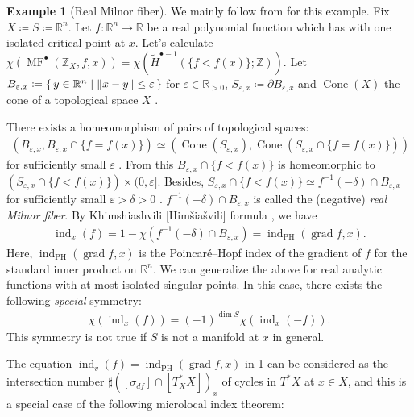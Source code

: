 \documentclass[a4paper,dvipdfmx,reqno,12pt]{amsart}
\theoremstyle{definition}
\newtheorem{example}[theorem]{Example}
\newcommand{\deq}{\coloneqq}
\newcommand{\Z}{\mathbb{Z}}%
\newcommand{\vep}{\varepsilon}%
\newcommand{\opn}[1]{\operatorname{#1}}
\numberwithin{equation}{section}
\begin{document}
\begin{example}[{Real Milnor fiber}] 
\label{example-milnor-morse-data}
We mainly follow from \cite[3.2]{MR3779558} for this example.
Fix $X\deq S\deq \mathbb{R}^{n}$.
Let $f\colon {\mathbb{R}}^{n}\to {\mathbb{R}}$ be a real polynomial function
which has with one isolated critical point at $x$.
Let's calculate 
$\chi (\opn{MF}^{\bullet}(\Z_X,f,x))
=\chi(\tilde{H}^{\bullet-1}(\{f<f(x)\};\Z))$.
Let $B_{\vep,x}\deq \set{y\in {\mathbb{R}}^{n}\mid \|x-y\|\leq \vep}$
for $\vep \in \mathbb{R}_{> 0}$,
$S_{\vep,x}\deq\partial B_{\vep,x}$ and 
$\opn{Cone}(X)$ the cone of a topological space $X$
\cite[Example 4.4]{hatcherAlgebraicTopology2002a}.

There exists a homeomorphism of pairs of
topological spaces:
\begin{align}
(B_{\vep,x},B_{\vep,x}\cap \{f=f(x)\})\simeq 
(\opn{Cone}(S_{\vep,x}),\opn{Cone}(S_{\vep,x}\cap \{f=f(x)\}))
\end{align}
for sufficiently small $\vep$
\cite[Theorem 2.10]{MR0239612}.
From this $B_{\vep,x}\cap\{f<f(x)\}$ is homeomorphic to
$(S_{\vep,x}\cap \{f<f(x)\})\times (0,\vep]$.
Besides, $S_{\vep,x}\cap \{f<f(x)\}\simeq 
f^{-1}(-\delta)\cap B_{\vep,x}$
for sufficiently small $\vep>\delta>0$ 
\cite[Lemma 5.10]{MR0239612}.
$f^{-1}(-\delta)\cap B_{\vep,x}$ is called 
the (negative) \emph{real Milnor fiber}.
By Khimshiashvili [Himšiašvili] formula \cite{MR0458467}, we have
\begin{align} \label{equation-Khimshiashvili}
  \opn{ind}_x(f)
=1-\chi(f^{-1}(-\delta)\cap B_{\vep,x})
=\opn{ind}_{\opn{PH}}(\opn{grad} f,x).
\end{align}
Here, $\opn{ind}_{\opn{PH}}(\opn{grad} f,x)$ is the 
Poincar\'e--Hopf index of the gradient of $f$ for the standard 
inner product on ${\mathbb{R}}^{n}$.
We can generalize the above for real analytic functions with 
at most isolated singular points. 
In this case, there exists the following \emph{special} symmetry:
\begin{align}
\chi(\opn{ind}_x(f))=
(-1)^{\dim S}\chi(\opn{ind}_x(-f)).
\end{align}
This symmetry is not true if $S$ is not a manifold at $x$
in general. 
\end{example}

The equation $\opn{ind}_v(f)=
\opn{ind}_{\opn{PH}}(\opn{grad} f,x)$ in 
\cref{example-milnor-morse-data}
can be considered 
as the intersection number 
$\sharp ([\sigma_{df}]\cap [T^{*}_X X])_x$ of cycles in $T^{*}X$
at $x\in X$,
and this is a special case of
the following microlocal index theorem:
\end{document}
